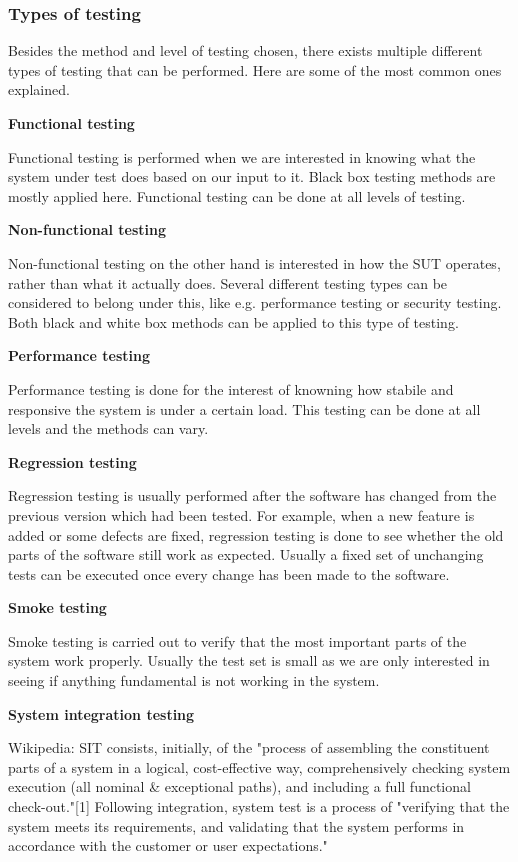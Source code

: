 \documentclass[english,12pt,a4paper,pdftex,elec,utf8]{aaltothesis}
\begin{document}
\subsubsection{Types of testing}
Besides the method and level of testing chosen, there exists multiple different types of testing that can be performed. Here are some of the most common ones explained.\par
\textbf{Functional testing}\par
Functional testing is performed when we are interested in knowing what the system under test does based on our input to it. Black box testing methods are mostly applied here. Functional testing can be done at all levels of testing.\par 
\textbf{Non-functional testing}\par
Non-functional testing on the other hand is interested in how the SUT operates, rather than what it actually does. Several different testing types can be considered to belong under this, like e.g. performance testing or security testing. Both black and white box methods can be applied to this type of testing.\par 
\textbf{Performance testing}\par
Performance testing is done for the interest of knowning how stabile and responsive the system is under a certain load. This testing can be done at all levels and the methods can vary.\par 
\textbf{Regression testing}\par
Regression testing is usually performed after the software has changed from the previous version which had been tested. For example, when a new feature is added or some defects are fixed, regression testing is done to see whether the old parts of the software still work as expected. Usually a fixed set of unchanging tests can be executed once every change has been made to the software. \cite{sularikurssi}\par 
\textbf{Smoke testing}\par
Smoke testing is carried out to verify that the most important parts of the system work properly. Usually the test set is small as we are only interested in seeing if anything fundamental is not working in the system.\par 
\textbf{System integration testing}\par
Wikipedia: SIT consists, initially, of the "process of assembling the constituent parts of a system in a logical, cost-effective way, comprehensively checking system execution (all nominal \& exceptional paths), and including a full functional check-out."[1] Following integration, system test is a process of "verifying that the system meets its requirements, and validating that the system performs in accordance with the customer or user expectations."\par
\end{document}
